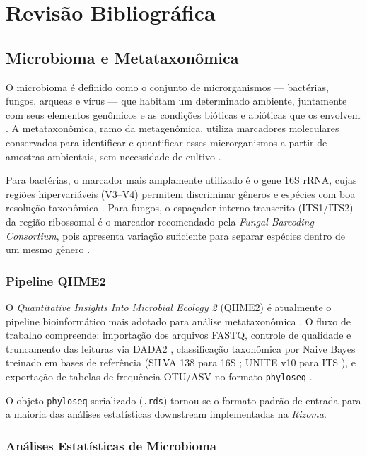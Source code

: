 \chapter{Revisão Bibliográfica}
\label{cap:revisao}

\section{Microbioma e Metataxonômica}

O microbioma é definido como o conjunto de microrganismos — bactérias,
fungos, arqueas e vírus — que habitam um determinado ambiente,
juntamente com seus elementos genômicos e as condições
bióticas e abióticas que os envolvem \cite{berg2020microbiome}.
A metataxonômica, ramo da metagenômica, utiliza marcadores moleculares
conservados para identificar e quantificar esses microrganismos a
partir de amostras ambientais, sem necessidade de cultivo
\cite{knight2018best}.

Para bactérias, o marcador mais amplamente utilizado é o gene 16S
rRNA, cujas regiões hipervariáveis (V3--V4) permitem discriminar
gêneros e espécies com boa resolução taxonômica
\cite{johnson2019evaluation}. Para fungos, o espaçador interno
transcrito (ITS1/ITS2) da região ribossomal é o marcador recomendado
pela \textit{Fungal Barcoding Consortium}, pois apresenta variação
suficiente para separar espécies dentro de um mesmo gênero
\cite{schoch2012nuclear}.

\subsection{Pipeline QIIME2}

O \textit{Quantitative Insights Into Microbial Ecology 2} (QIIME2) é
atualmente o pipeline bioinformático mais adotado para análise
metataxonômica \cite{bolyen2019reproducible}. O fluxo de trabalho
compreende: importação dos arquivos FASTQ, controle de qualidade e
truncamento das leituras via DADA2 \cite{callahan2016dada2},
classificação taxonômica por Naive Bayes treinado em bases de referência
(SILVA 138 para 16S \cite{quast2012silva}; UNITE v10 para ITS
\cite{nilsson2019unite}), e exportação de tabelas de frequência OTU/ASV
no formato \texttt{phyloseq} \cite{mcmurdie2013phyloseq}.

O objeto \texttt{phyloseq} serializado (\texttt{.rds}) tornou-se o
formato padrão de entrada para a maioria das análises estatísticas
downstream implementadas na \textit{Rizoma}.

\subsection{Análises Estatísticas de Microbioma}

